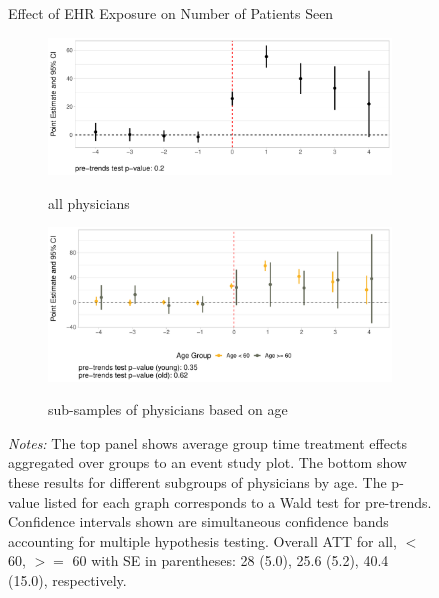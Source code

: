 \documentclass[12pt]{article}
\begin{document}
\begin{figure}[ht!]
\centering
    \captionsetup{width=.85\linewidth}
    \caption{Effect of EHR Exposure on Number of Patients Seen}
   \begin{subfigure}[]{.8\textwidth}
   \caption{all physicians}
   \includegraphics[scale=.5]{Objects/patient_plot_all.pdf}
   \label{fig:patienta} 
\end{subfigure}

\vspace{3mm}

\begin{subfigure}[]{.8\textwidth}
\caption{sub-samples of physicians based on age}
   \includegraphics[scale=.5]{Objects/patient_plot_ages.pdf}
   \label{fig:patientb}
\end{subfigure}
\vspace{2mm}
    \caption*{\footnotesize{\textit{Notes:} The top panel shows average group time treatment effects aggregated over groups to an event study plot. The bottom show these results for different subgroups of physicians by age. The p-value listed for each graph corresponds to a Wald test for pre-trends. Confidence intervals shown are simultaneous confidence bands accounting for multiple hypothesis testing. Overall ATT for all, $<$ 60, $>=$ 60 with SE in parentheses: 28 (5.0), 25.6 (5.2), 40.4 (15.0), respectively.}}
\end{figure}
\end{document}
